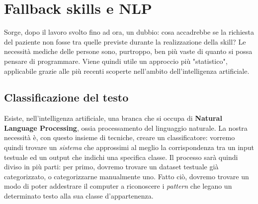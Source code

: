\chapter{Fallback skills e NLP}
\label{chap:fallback}
Sorge, dopo il lavoro svolto fino ad ora, un dubbio: cosa accadrebbe se la richiesta del paziente non fosse tra quelle previste durante la realizzazione della skill?
Le necessità mediche delle persone sono, purtroppo, ben più vaste di quanto si possa pensare di programmare. Viene quindi utile un approccio più "statistico", applicabile grazie alle più recenti scoperte nell'ambito dell'intelligenza artificiale.
\section{Classificazione del testo}
Esiste, nell'intelligenza artificiale, una branca che si occupa di \textbf{Natural Language Processing}, ossia processamento del linguaggio naturale. La nostra necessità è, con questo insieme di tecniche, creare un classificatore: vorremo quindi trovare un \textit{sistema} che approssimi al meglio la corrispondenza tra un input testuale ed un output che indichi una specifica classe. Il processo sarà quindi diviso in più parti: per primo, dovremo trovare un dataset testuale già categorizzato, o categorizzarne manualmente uno. Fatto ciò, dovremo trovare un modo di poter addestrare il computer a riconoscere i \textit{pattern} che legano un determinato testo alla sua classe d'appartenenza.
